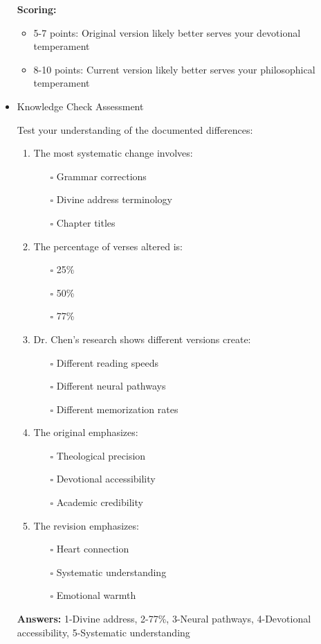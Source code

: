 \documentclass[11pt,twoside]{book}
\begin{document}
\begin{itemize}
\textbf{\textbf{Scoring:}}
\begin{itemize}
\item 5-7 points: Original version likely better serves your devotional temperament
\item 8-10 points: Current version likely better serves your philosophical temperament
\end{itemize}
\item Knowledge Check Assessment
\label{sec:orgace1019}

Test your understanding of the documented differences:

\begin{enumerate}
\item The most systematic change involves:
\begin{itemize}
\item[{$\square$}] Grammar corrections
\item[{$\square$}] Divine address terminology
\item[{$\square$}] Chapter titles
\end{itemize}

\item The percentage of verses altered is:
\begin{itemize}
\item[{$\square$}] 25\%
\item[{$\square$}] 50\%
\item[{$\square$}] 77\%
\end{itemize}

\item Dr. Chen's research shows different versions create:
\begin{itemize}
\item[{$\square$}] Different reading speeds
\item[{$\square$}] Different neural pathways
\item[{$\square$}] Different memorization rates
\end{itemize}

\item The original emphasizes:
\begin{itemize}
\item[{$\square$}] Theological precision
\item[{$\square$}] Devotional accessibility
\item[{$\square$}] Academic credibility
\end{itemize}

\item The revision emphasizes:
\begin{itemize}
\item[{$\square$}] Heart connection
\item[{$\square$}] Systematic understanding
\item[{$\square$}] Emotional warmth
\end{itemize}
\end{enumerate}

\textbf{\textbf{Answers:}} 1-Divine address, 2-77\%, 3-Neural pathways, 4-Devotional accessibility, 5-Systematic understanding
\end{itemize}
\end{document}
